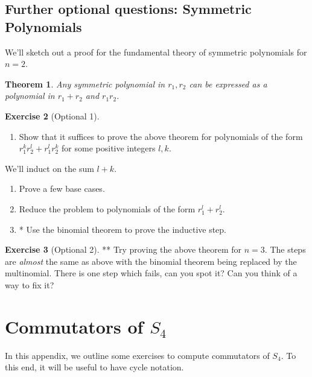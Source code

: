 \documentclass[reqno, 12pt, letter]{article}
\theoremstyle{plain}
\newtheorem{theorem}{Theorem}[section]
\theoremstyle{definition}
\newtheorem{exercise}[theorem]{Exercise}
\theoremstyle{remark}
\numberwithin{equation}{section}
\begin{document}
\subsection{Further optional questions: Symmetric Polynomials}
We'll sketch out a proof for the fundamental theory of symmetric polynomials for $ n=2$.
	\begin{theorem}
		\label{theorem:fundamental_theorem_symmetric_polynomials}
		Any symmetric polynomial in $ r_1, r_2$ can be expressed as a polynomial in $ r_1 + r_2$ and $r_1 r_2$. 
	\end{theorem}
	\begin{exercise}[Optional 1]
		\begin{enumerate}
			\item Show that it suffices to prove the above theorem for polynomials of the form $ r_1^k r_2^l + r_1^l r_2^k$ for some positive integers $l,k$.
		\end{enumerate}
		We'll induct on the sum $ l+k$.
		\begin{enumerate}[resume]
			\item Prove a few base cases.
			\item Reduce the problem to polynomials of the form $ r_1^l + r_2^l$.
			\item* Use the binomial theorem to prove the inductive step.
		\end{enumerate}
	\end{exercise}
	
	\begin{exercise}[Optional 2] **
		Try proving the above theorem for $ n=3$. The steps are \emph{almost} the same as above with the binomial theorem being replaced by the multinomial. There is one step which fails, can you spot it? Can you think of a way to fix it?
	\end{exercise}



\newpage
\appendix
\section{Commutators of $S_4$}
\label{appendix:commutators-s4}
In this appendix, we outline some exercises to compute commutators of $S_4$.
To this end, it will be useful to have cycle notation.
\end{document}
